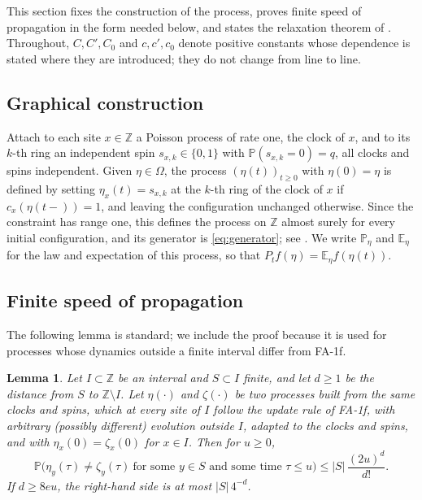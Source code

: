\documentclass[11pt]{amsart}
\newtheorem{lemma}[theorem]{Lemma}
\theoremstyle{remark}
\newcommand{\PP}{\mathbb{P}}
\newcommand{\E}{\mathbb{E}}
\newcommand{\Z}{\mathbb{Z}}
\begin{document}
This section fixes the construction of the process, proves finite speed of propagation in the form needed below,
and states the relaxation theorem of \cite{BCMRT13}. Throughout, $C,C',C_0$ and $c,c',c_0$ denote positive
constants whose dependence is stated where they are introduced; they do not change from line to line.

\subsection{Graphical construction}
Attach to each site $x\in\Z$ a Poisson process of rate one, the clock of $x$, and to its $k$-th ring an independent
spin $s_{x,k}\in\{0,1\}$ with $\PP(s_{x,k}=0)=q$, all clocks and spins independent. Given $\eta\in\Omega$, the
process $(\eta(t))_{t\ge0}$ with $\eta(0)=\eta$ is defined by setting $\eta_x(t)=s_{x,k}$ at the $k$-th ring of the
clock of $x$ if $c_x(\eta(t-))=1$, and leaving the configuration unchanged otherwise. Since the constraint has range
one, this defines the process on $\Z$ almost surely for every initial configuration, and its generator is
\eqref{eq:generator}; see \cite{CMRT08}. We write $\PP_\eta$ and $\E_\eta$ for the law and expectation of this
process, so that $P_tf(\eta)=\E_\eta f(\eta(t))$.

\subsection{Finite speed of propagation}
The following lemma is standard; we include the proof because it is used for processes whose dynamics outside a
finite interval differ from FA-1f.

\begin{lemma}\label{lem:fp}
Let $I\subset\Z$ be an interval and $S\subset I$ finite, and let $d\ge1$ be the distance from $S$ to $\Z\setminus I$.
Let $\eta(\cdot)$ and $\zeta(\cdot)$ be two processes built from the same clocks and spins, which at every site of
$I$ follow the update rule of FA-1f, with arbitrary (possibly different) evolution outside $I$, adapted to the
clocks and spins, and with $\eta_x(0)=\zeta_x(0)$ for $x\in I$. Then for $u\ge0$,
\begin{equation}\label{eq:fp}
\PP\bigl(\eta_y(\tau)\ne\zeta_y(\tau)\ \text{for some }y\in S\text{ and some time }\tau\le u\bigr)\le|S|\,\frac{(2u)^d}{d!}.
\end{equation}
If $d\ge8eu$, the right-hand side is at most $|S|\,4^{-d}$.
\end{lemma}
\end{document}

